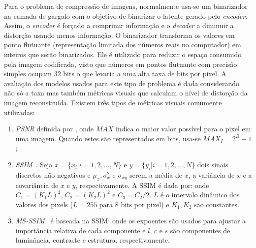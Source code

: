 Para o problema de compressão de imagens, normalmente usa-se um binarizador na camada de gargalo com o objetivo de binarizar o latente gerado pelo \textit{encoder}. Assim, o \textit{encoder} é forçado a comprimir informação e o \textit{decoder} a diminuir a distorção usando menos informação. O binarizador transforma os valores em ponto flutuante (representação limitada dos números reais no computador) em inteiros que serão binarizados. Ele é utilizado para reduzir o espaço consumido pela imagem codificada, visto que números em pontos flutuante com precisão simples ocupam 32 bits o que levaria a uma alta taxa de bits por pixel. A avaliação dos modelos usados para este tipo de problema é dada considerando não só a taxa mas também métricas visuais que calculam o nível de distorção da imagem reconstruída. Existem três tipos de métricas visuais comumente utilizadas:
\begin{enumerate}
    \item \textit{\acrshort{PSNR}} definida por , onde $MAX$ indica o maior valor possível para o pixel em uma imagem. Quando estes são representados em bits, usa-se $MAX_I = 2^B - 1$;
    \item \textit{\acrshort{SSIM}}~\cite{wang2004image}. Seja $x = \{x_i|i = 1,2,\dots,N\}$ e $y = \{y_i|i = 1,2,\dots,N\}$ dois sinais discretos não negativos e $\mu_x, \sigma_x^2$ e $\sigma_{xy}$ serem a média de $x$, a variância de $x$ e a covariância de $x$ e $y$, respectivamente. A \acrshort{SSIM} é dada por:
     onde $C_1 = {(K_1L)}^2$, $C_2 = {(K_2L)}^2$ e $C_3 = C_2/2$. $L$ é o intervalo dinâmico dos valores dos pixels ($L = 255$ para 8 bits por pixel) e $K_1, K_2$ são constantes.
    \item \textit{\acrshort{MS-SSIM}}~\cite{wang2003multiscale} é baseada na \acrshort{SSIM}: 
    \equacao{MS-SSIM}{MS-SSIM(x,y) = {[l_M(x,y)]}^{\alpha M} \cdot \prod_{j=1}^{M}{[c_j(x,y)}^{\beta_j}{[s_j(x,y)]}^{\gamma_j},} onde os expoentes são usados para ajustar a importância relativa de cada componente e $l$, $c$ e $s$ são componentes de luminância, contraste e estrutura, respectivamente.
\end{enumerate}
